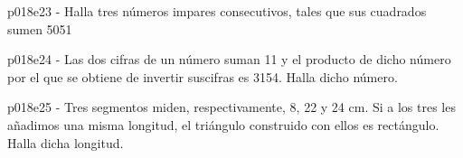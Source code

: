 \documentclass[spanish, 11pt]{exam}
\begin{document}
\begin{questions}
\begin{multicols}{2}
\begin{parts}
        \end{parts}
        \end{multicols}
        \question p018e23 - Halla tres números impares consecutivos, tales que sus cuadrados sumen 5051
        \begin{multicols}{2} 
        \end{multicols}
        \question p018e24 - Las dos cifras de un número suman 11 y el producto de dicho número por el que se obtiene de invertir suscifras es 3154. Halla dicho número.
        \begin{multicols}{2} 
        \end{multicols}
        \question p018e25 - Tres segmentos miden, respectivamente, 8, 22 y 24 cm. 
Si a los tres les añadimos una misma longitud, el triángulo construido con ellos es rectángulo. Halla dicha longitud.
        \begin{multicols}{2} 

\end{multicols}
\end{questions}
\end{document}
